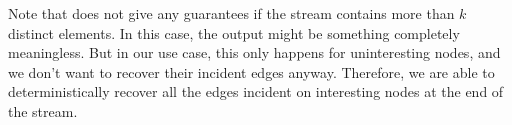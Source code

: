 \documentclass{theoretics}
\newcommand{\truncatedpivot}{\textrm{Truncated-Pivot}\xspace}
\newcommand{\eps}{\ensuremath{\varepsilon}}
\begin{document}
{Note that  does not give any guarantees if the stream contains more than $k$ distinct elements. In this case, the output might be something completely meaningless. But in our use case, this only happens for uninteresting nodes, and we don't want to recover their incident edges anyway. Therefore, we are able to deterministically recover all the edges incident on interesting nodes at the end of the stream.


}
\end{document}
